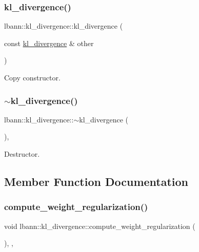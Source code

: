 \subsubsection{\texorpdfstring{kl\+\_\+divergence()}{kl\_divergence()}\hspace{0.1cm}{\footnotesize\ttfamily [2/2]}}
{\footnotesize\ttfamily lbann\+::kl\+\_\+divergence\+::kl\+\_\+divergence (\begin{DoxyParamCaption}\item[{const \hyperlink{classlbann_1_1kl__divergence}{kl\+\_\+divergence} \&}]{other }\end{DoxyParamCaption})\hspace{0.3cm}{\ttfamily [default]}}

Copy constructor. \mbox{\label{classlbann_1_1kl__divergence_ad256b4593f170d9dfa5b17ca9a8ac0cc}} 
\subsubsection{\texorpdfstring{$\sim$kl\+\_\+divergence()}{~kl\_divergence()}}
{\footnotesize\ttfamily lbann\+::kl\+\_\+divergence\+::$\sim$kl\+\_\+divergence (\begin{DoxyParamCaption}{ }\end{DoxyParamCaption})\hspace{0.3cm}{\ttfamily [override]}, {\ttfamily [default]}}

Destructor. 

\subsection{Member Function Documentation}
\mbox{\label{classlbann_1_1kl__divergence_a6f9e18587348fa8dc6871c404232f121}} 
\subsubsection{\texorpdfstring{compute\+\_\+weight\+\_\+regularization()}{compute\_weight\_regularization()}}
{\footnotesize\ttfamily void lbann\+::kl\+\_\+divergence\+::compute\+\_\+weight\+\_\+regularization (\begin{DoxyParamCaption}{ }\end{DoxyParamCaption})\hspace{0.3cm}{\ttfamily [inline]}, {\ttfamily [override]}, {\ttfamily [virtual]}}

